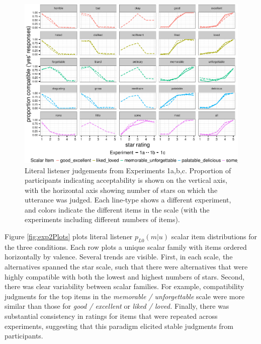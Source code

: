 \documentclass[10pt, letterpaper]{article}
\newenvironment{CodeChunk}{}{}
\begin{document}
\begin{CodeChunk}
\begin{figure}[t]

{\centering \includegraphics{figs/exp1Plots-1} 

}

\caption[Literal listener judgements from Experiments 1a,b,c]{Literal listener judgements from Experiments 1a,b,c. Proportion of participants indicating acceptability is shown on the vertical axis, with the horizontal axis showing number of stars on which the utterance was judged. Each line-type shows a different experiment, and colors indicate the different items in the scale (with the experiments including different numbers of items).}\label{fig:exp1Plots}
\end{figure}
\end{CodeChunk}

Figure \ref{fig:exp2Plots} plots literal listener \(p_{L0}(m|u)\) scalar
item distributions for the three conditions. Each row plots a unique
scalar family with items ordered horizontally by valence. Several trends
are visible. First, in each scale, the alternatives spanned the star
scale, such that there were alternatives that were highly compatible
with both the lowest and highest numbers of stars. Second, there was
clear variability between scalar families. For example, compatibility
judgments for the top items in the \emph{memorable / unforgettable}
scale were more similar than those for \emph{good / excellent} or
\emph{liked / loved.} Finally, there was substantial consistency in
ratings for items that were repeated across experiments, suggesting that
this paradigm elicited stable judgments from participants.
\end{document}

